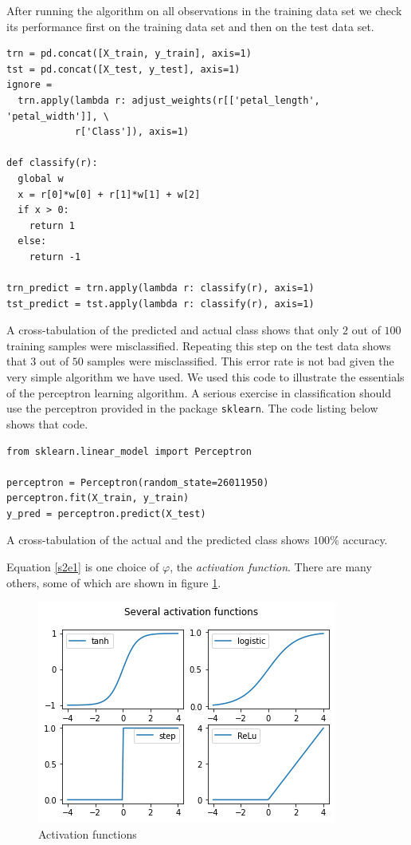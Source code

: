 \documentclass{article}
\numberwithin{equation}{section}
\begin{document}
After running the algorithm on all observations in the training data set
we check its performance first on the training data set and then on the
test data set.
\begin{verbatim}
trn = pd.concat([X_train, y_train], axis=1)
tst = pd.concat([X_test, y_test], axis=1)
ignore = 
  trn.apply(lambda r: adjust_weights(r[['petal_length', 'petal_width']], \
            r['Class']), axis=1)

def classify(r):
  global w
  x = r[0]*w[0] + r[1]*w[1] + w[2]
  if x > 0:
    return 1
  else:
    return -1

trn_predict = trn.apply(lambda r: classify(r), axis=1)
tst_predict = tst.apply(lambda r: classify(r), axis=1)
\end{verbatim}

A cross-tabulation of the predicted and actual class shows that only $2$
out of $100$ training samples were misclassified. Repeating this step on
the test data shows that $3$ out of $50$ samples were misclassified. This 
error rate is not bad given the very simple algorithm we have used. We 
used this code to illustrate the essentials of the perceptron learning 
algorithm. A serious exercise in classification should use the perceptron
provided in the package \texttt{sklearn}. The code 
listing below shows that code.
\begin{verbatim}
from sklearn.linear_model import Perceptron

perceptron = Perceptron(random_state=26011950)
perceptron.fit(X_train, y_train)
y_pred = perceptron.predict(X_test)
\end{verbatim}
A cross-tabulation of the actual and the predicted class shows $100\%$
accuracy.

Equation \eqref{s2e1} is one choice of $\varphi$, the \emph{activation
function}. There are many others, some of which are shown in figure
\ref{f3}.
\begin{figure}[!ht]
\centering
\includegraphics[scale=0.8]{activation}
\caption{Activation functions}
\label{f3}
\end{figure}
\end{document}
